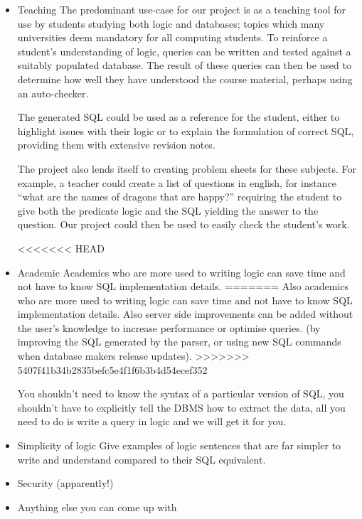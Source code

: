 \documentclass[a4paper, 11pt]{article}
\begin{document}
    \begin{itemize}
      \item Teaching
The predominant use-case for our project is as a teaching tool for use by
  students studying both logic and databases; topics which
  many universities deem mandatory for all computing students. To
  reinforce a student's understanding of logic, queries can be written and
  tested against a suitably populated database. The result of these queries
  can then be used to determine how well they have understood the course
  material, perhaps using an auto-checker.

  The generated SQL could be used as a reference for the student, either to
  highlight issues with their logic or to explain the formulation of correct
  SQL, providing them with extensive revision notes.

  The project also lends itself to creating problem sheets for these subjects.
  For example, a teacher could create a list of questions in english, for instance
  ``what are the names of dragons that are happy?'' requiring the student to
  give both the predicate logic and the SQL yielding the answer to the
  question. Our project could then be used to easily check the student's work.

<<<<<<< HEAD
      \item Academic
  Academics who are more used to writing logic can save time and not have
  to know SQL implementation details.
=======
  Also academics who are more used to writing logic can save time and not have
  to know SQL implementation details. Also server side improvements can be added
  without the user's knowledge to increase performance or optimise queries. (by
  improving the SQL generated by the parser, or using new SQL commands when
  database makers release updates).
>>>>>>> 5407f41b34b2835befc5e4f1f6b3b4d54ecef352

You shouldn't need to know the syntax of a particular
version of SQL, you shouldn't have to explicitly tell the DBMS how to extract
the data, all you need to do is write a query in logic and we will
get it for you.

      \item Simplicity of logic
Give examples of logic sentences that are far simpler to write and understand
compared to their SQL equivalent.

      \item Security (apparently!)

      \item Anything else you can come up with


    \end{itemize}
\end{document}
